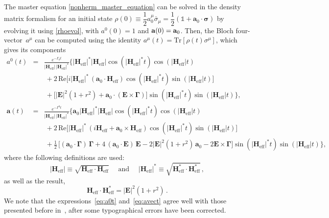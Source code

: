 \documentclass[12pt,a4paper]{article}
\begin{document}
The master equation \eqref{nonherm_master_equation} can be solved in the density matrix formalism for an initial state $\rho(0) \equiv \dfrac{1}{2}a_0^\mu\bar{\sigma}_\mu=\dfrac{1}{2}(\mathbb{1} + \mathbf{a}_0\cdot\boldsymbol{\sigma})$ by evolving it using \eqref{rhoevol}, with $a^0(0) = 1$ and ${\bf a}(0) = {\bf a}_0$. Then, the Bloch four-vector~$a^\mu$ can be computed using the identity $a^\mu(t) = \mathrm{Tr}[\rho(t) \sigma^\mu]$, which gives its components
\begin{eqnarray}
   \label{eq:a0t}
    a^0(t) \!&=&\! \frac{e^{-\Gamma_0 t}}{|\mathbf{H}_{\text{eff}}|\,|\mathbf{H}_{\text{eff}}|^*} 
    \bigg\{
    |\mathbf{H}_{\text{eff}}|^*|\mathbf{H}_{\text{eff}}| \cos (|\mathbf{H}_{\text{eff}}|^* t) \cos (|\mathbf{H}_{\text{eff}}| t) 
    \nonumber\\
    &&\
    +2 \, \text{Re} \Big[ i |\mathbf{H}_{\text{eff}}|^* \, (\mathbf{a}_0 \cdot \mathbf{H}_{\text{eff}}) \cos (|\mathbf{H}_{\text{eff}}|^* t) \sin (|\mathbf{H}_{\text{eff}}| t) \Big] \\
    &&\  +\Big[|\mathbf{E}|^2 (1 + r^2)+ \mathbf{a}_0 \cdot (\mathbf{E} \times \mathbf{\Gamma})\Big] \sin (|\mathbf{H}_{\text{eff}}|^* t)\sin (|\mathbf{H}_{\text{eff}}| t)
    \bigg\},
    \nonumber\\
   \label{eq:avect} 
    \mathbf{a}(t) \!&=&\! \frac{e^{-\Gamma^0 t}}{|\mathbf{H}_{\text{eff}}|\,|\mathbf{H}_{\text{eff}}|^*} 
    \bigg\{
    \mathbf{a}_0 |\mathbf{H}_{\text{eff}}|^*|\mathbf{H}_{\text{eff}}| \cos (|\mathbf{H}_{\text{eff}}|^* t) \cos (|\mathbf{H}_{\text{eff}}| t)
    \nonumber\\
    &&\ + 2 \, \text{Re} \Big[ |\mathbf{H}_{\text{eff}}|^* \, (i\mathbf{H}_{\text{eff}} + \mathbf{a}_0 \times \mathbf{H}_{\text{eff}}) \cos (|\mathbf{H}_{\text{eff}}|^* t) \sin (|\mathbf{H}_{\text{eff}}| t) \Big] \\
    &&\ +\frac{1}{2} \, \Big[(\mathbf{a}_0 \cdot \mathbf{\Gamma}) \, \mathbf{\Gamma} + 4 \, (\mathbf{a}_0 \cdot \mathbf{E}) \, \mathbf{E} - 2 |\mathbf{E}|^2(1+r^2) \, \mathbf{a}_0 - 2 \mathbf{E} \times \mathbf{\Gamma} \Big]  \sin (|\mathbf{H}_{\text{eff}}|^* t) \sin (|\mathbf{H}_{\text{eff}}| t)
    \bigg\},\nonumber
\end{eqnarray}
where the following definitions are used: 
\begin{equation}
|\mathbf{H}_{\text{eff}}| \equiv \sqrt{\mathbf{H}_{\text{eff}}\cdot \mathbf{H}_{\text{eff}}} \quad\text{ and } \quad|\mathbf{H}_{\text{eff}}|^* \equiv \sqrt{\mathbf{H}^*_{\text{eff}}\cdot \mathbf{H}^*_{\text{eff}}}\,,
\end{equation}
as well as the result,
\begin{equation}
\mathbf{H}_{\text{eff}}\cdot \mathbf{H}_{\text{eff}}^* = |\mathbf{E}|^2(1+r^2)\,. 
\end{equation}
We note that the expressions~\eqref{eq:a0t} and~\eqref{eq:avect} agree well with those presented before in~\cite{Karamitros:2022oew}, after some typographical errors have been corrected.  
\end{document}
